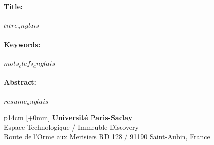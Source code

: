 \documentclass[12pt,a4paper]{reedthesis}
\begin{document}
\begin{mdframed}[linecolor=Prune,linewidth=1]
\vspace{-.25cm}
\paragraph*{Title:} $titre_anglais$

\begin{small}
\vspace{-.25cm}
\paragraph*{Keywords:} $mots_clefs_anglais$

\vspace{-.5cm}
\begin{multicols}{2}
\paragraph*{Abstract:} $resume_anglais$
\end{multicols}
\end{small}
\end{mdframed}


\vfill
{}\selectfont
\noindent\begin{tabular}{p{14cm}}
[+0mm]{\small {\color{Prune} {\bf Université Paris-Saclay}\\
{\scriptsize Espace Technologique / Immeuble Discovery}\\
{\scriptsize  Route de l’Orme aux Merisiers RD 128 / 91190 Saint-Aubin, France}}}\\\mbox{}
\end{tabular}


\end{document}

